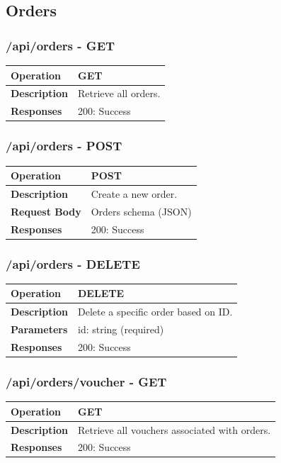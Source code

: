 \subsection{Orders}

\subsubsection*{/api/orders - GET}
\begin{tabular}{|>{\raggedright\arraybackslash}p{3cm}|p{12cm}|}
\hline
\textbf{Operation} & GET \\
\hline
\textbf{Description} & Retrieve all orders. \\
\hline
\textbf{Responses} & 200: Success \\
\hline
\end{tabular}

\subsubsection*{/api/orders - POST}
\begin{tabular}{|>{\raggedright\arraybackslash}p{3cm}|p{12cm}|}
\hline
\textbf{Operation} & POST \\
\hline
\textbf{Description} & Create a new order. \\
\hline
\textbf{Request Body} & Orders schema (JSON) \\
\hline
\textbf{Responses} & 200: Success \\
\hline
\end{tabular}

\subsubsection*{/api/orders - DELETE}
\begin{tabular}{|>{\raggedright\arraybackslash}p{3cm}|p{12cm}|}
\hline
\textbf{Operation} & DELETE \\
\hline
\textbf{Description} & Delete a specific order based on ID. \\
\hline
\textbf{Parameters} & id: string (required) \\
\hline
\textbf{Responses} & 200: Success \\
\hline
\end{tabular}

\subsubsection*{/api/orders/voucher - GET}
\begin{tabular}{|>{\raggedright\arraybackslash}p{3cm}|p{12cm}|}
\hline
\textbf{Operation} & GET \\
\hline
\textbf{Description} & Retrieve all vouchers associated with orders. \\
\hline
\textbf{Responses} & 200: Success \\
\hline
\end{tabular}

